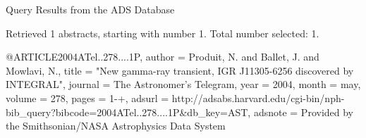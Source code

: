 Query Results from the ADS Database


Retrieved 1 abstracts, starting with number 1.  Total number selected: 1.

@ARTICLE{2004ATel..278....1P,
   author = {{Produit}, N. and {Ballet}, J. and {Mowlavi}, N.},
    title = "{New gamma-ray transient, IGR J11305-6256 discovered by INTEGRAL}",
  journal = {The Astronomer's Telegram},
     year = 2004,
    month = may,
   volume = 278,
    pages = {1-+},
   adsurl = {http://adsabs.harvard.edu/cgi-bin/nph-bib_query?bibcode=2004ATel..278....1P&db_key=AST},
  adsnote = {Provided by the Smithsonian/NASA Astrophysics Data System}
}


